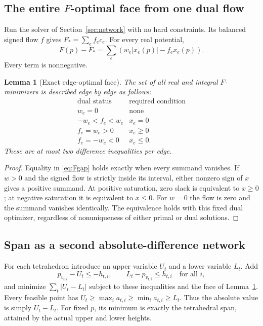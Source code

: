 \documentclass[11pt,letterpaper]{article}
\newtheorem{lemma}[theorem]{Lemma}
\theoremstyle{definition}
\newcommand{\Fmin}{F_*}
\begin{document}
\subsection{The entire \texorpdfstring{$F$}{F}-optimal face from one dual flow}
Run the solver of Section~\ref{sec:network} with no hard constraints. Its balanced signed flow $f$ gives $\Fmin=\sum_e f_ec_e$. For every real potential,
\begin{equation}\label{eq:Fgap}
 F(p)-\Fmin=\sum_e\left(w_e|x_e(p)|-f_ex_e(p)\right).
\end{equation}
Every term is nonnegative.

\begin{lemma}[Exact edge-optimal face]\label{lem:Fface}
The set of all real and integral $F$-minimizers is described edge by edge as follows:
\[
 \begin{array}{c|c}
 \text{dual status}&\text{required condition}\\\hline
 w_e=0&\text{none}\\
 -w_e<f_e<w_e&x_e=0\\
 f_e=w_e>0&x_e\geq0\\
 f_e=-w_e<0&x_e\leq0.
 \end{array}
\]
These are at most two difference inequalities per edge.
\end{lemma}
\begin{proof}
Equality in \eqref{eq:Fgap} holds exactly when every summand vanishes. If $w>0$ and the signed flow is strictly inside its interval, either nonzero sign of $x$ gives a positive summand. At positive saturation, zero slack is equivalent to $x\geq0$; at negative saturation it is equivalent to $x\leq0$. For $w=0$ the flow is zero and the summand vanishes identically. The equivalence holds with this fixed dual optimizer, regardless of nonuniqueness of either primal or dual solutions.
\end{proof}

\subsection{Span as a second absolute-difference network}
For each tetrahedron introduce an upper variable $U_t$ and a lower variable $L_t$. Add
\begin{equation}\label{eq:auxspan}
 p_{v_{t,i}}-U_t\leq-h_{t,i},\qquad
 L_t-p_{v_{t,i}}\leq h_{t,i}\quad\text{for all }i,
\end{equation}
and minimize $\sum_t|U_t-L_t|$ subject to these inequalities and the face of Lemma~\ref{lem:Fface}. Every feasible point has $U_t\geq\max_i a_{t,i}\geq\min_i a_{t,i}\geq L_t$. Thus the absolute value is simply $U_t-L_t$. For fixed $p$, its minimum is exactly the tetrahedral span, attained by the actual upper and lower heights.
\end{document}

